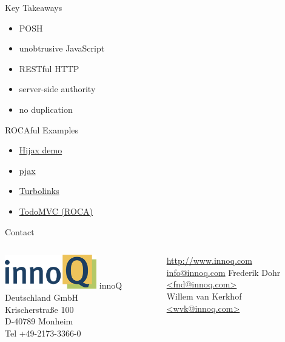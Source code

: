 \documentclass{beamer}
\begin{document}
\begin{frame}{Key Takeaways}
  \begin{itemize}
    \item POSH
    \item unobtrusive JavaScript
    \item RESTful HTTP
    \item server-side authority
    \item no duplication
  \end{itemize}
\end{frame}

\begin{frame}{ROCAful Examples}
  \begin{itemize}
    \item \href{http://fnd.github.com/hijax-demo/}{Hijax demo}
    \item \href{http://pjax.heroku.com}{pjax}
    \item \href{https://github.com/rails/turbolinks}{Turbolinks}
    \item \href{http://rocatodo.herokuapp.com}{TodoMVC (ROCA)}
  \end{itemize}
\end{frame}

\begin{frame}{Contact}
  \begin{columns}
    \column{5cm}
    \includegraphics[width=4cm]{images/innoQ-Logo-RGB-72dpi.png}
    \vskip5mm
    innoQ Deutschland GmbH \\
    Krischerstraße 100 \\
    D-40789 Monheim \\
    Tel +49-2173-3366-0
    \column{4.5cm}

    \href{http://www.innoq.com}{http://www.innoq.com} \\
    \href{mailto:info@innoq.com}{info@innoq.com}
    \vskip5mm
    Frederik Dohr \href{mailto:fnd@innoq.com}{<fnd@innoq.com>} \\
    \vskip4mm
    Willem van Kerkhof \href{mailto:wvk@innoq.com}{<wvk@innoq.com>} \\

  \end{columns}
\end{frame}
\end{document}

